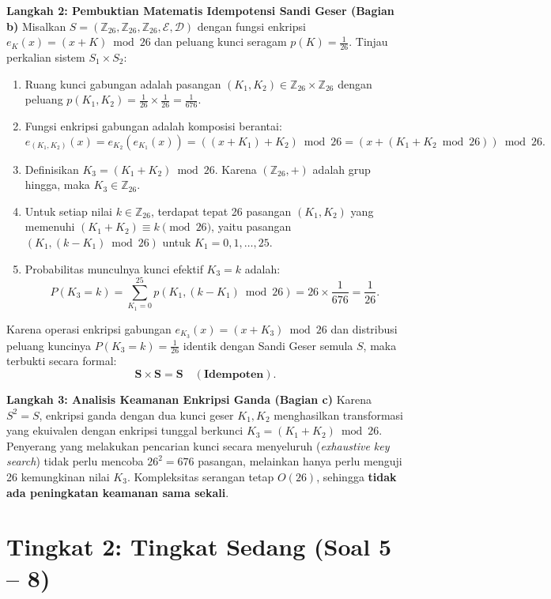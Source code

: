 \documentclass[11pt,a4paper]{article}
\begin{document}
\noindent\textbf{Langkah 2: Pembuktian Matematis Idempotensi Sandi Geser (Bagian b)}
Misalkan $S = (\mathbb{Z}_{26}, \mathbb{Z}_{26}, \mathbb{Z}_{26}, \mathcal{E}, \mathcal{D})$ dengan fungsi enkripsi $e_K(x) = (x + K) \bmod 26$ dan peluang kunci seragam $p(K) = \frac{1}{26}$.
Tinjau perkalian sistem $S_1 \times S_2$:
\begin{enumerate}
    \item Ruang kunci gabungan adalah pasangan $(K_1, K_2) \in \mathbb{Z}_{26} \times \mathbb{Z}_{26}$ dengan peluang $p(K_1, K_2) = \frac{1}{26} \times \frac{1}{26} = \frac{1}{676}$.
    \item Fungsi enkripsi gabungan adalah komposisi berantai:
    \[
    e_{(K_1, K_2)}(x) = e_{K_2}(e_{K_1}(x)) = ((x + K_1) + K_2) \bmod 26 = (x + (K_1 + K_2 \bmod 26)) \bmod 26.
    \]
    \item Definisikan $K_3 = (K_1 + K_2) \bmod 26$. Karena $(\mathbb{Z}_{26}, +)$ adalah grup hingga, maka $K_3 \in \mathbb{Z}_{26}$.
    \item Untuk setiap nilai $k \in \mathbb{Z}_{26}$, terdapat tepat 26 pasangan $(K_1, K_2)$ yang memenuhi $(K_1 + K_2) \equiv k \pmod{26}$, yaitu pasangan $(K_1, (k - K_1) \bmod 26)$ untuk $K_1 = 0, 1, \dots, 25$.
    \item Probabilitas munculnya kunci efektif $K_3 = k$ adalah:
    \[
    P(K_3 = k) = \sum_{K_1=0}^{25} p(K_1, (k - K_1) \bmod 26) = 26 \times \frac{1}{676} = \frac{1}{26}.
    \]
\end{enumerate}
Karena operasi enkripsi gabungan $e_{K_3}(x) = (x + K_3) \bmod 26$ dan distribusi peluang kuncinya $P(K_3 = k) = \frac{1}{26}$ identik dengan Sandi Geser semula $S$, maka terbukti secara formal:
\[
\mathbf{S \times S = S \quad (\text{Idempoten})}.
\]

\noindent\textbf{Langkah 3: Analisis Keamanan Enkripsi Ganda (Bagian c)}
Karena $S^2 = S$, enkripsi ganda dengan dua kunci geser $K_1, K_2$ menghasilkan transformasi yang ekuivalen dengan enkripsi tunggal berkunci $K_3 = (K_1 + K_2) \bmod 26$. Penyerang yang melakukan pencarian kunci secara menyeluruh (\textit{exhaustive key search}) tidak perlu mencoba $26^2 = 676$ pasangan, melainkan hanya perlu menguji 26 kemungkinan nilai $K_3$. Kompleksitas serangan tetap $O(26)$, sehingga \textbf{tidak ada peningkatan keamanan sama sekali}.

\vspace{0.6cm}

\section{Tingkat 2: Tingkat Sedang (Soal 5 -- 8)}
\end{document}
